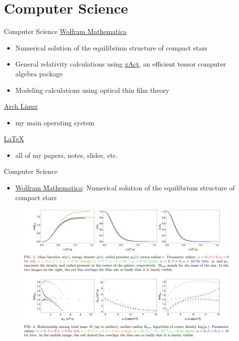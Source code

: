 \documentclass[9pt,aspectratio=169,hyperref=colorlinks]{beamer}
\begin{document}
\section{Computer Science}
\begin{frame}{Computer Science}
    \href{https://www.wolfram.com/mathematica/}{Wolfram Mathematica}
    \begin{itemize}
        \item Numerical solution of the equilibrium structure of compact stars
        \item General relativity calculations using \href{http://xact.es/index.html}{xAct}, an efficient tensor computer algebra package
        \item Modeling calculations using optical thin film theory
    \end{itemize}

    \href{https://archlinux.org}{Arch Linux}
    \begin{itemize}
        \item my main operating system
    \end{itemize}

    \href{https://www.latex-project.org}{\LaTeX}
    \begin{itemize}
        \item all of my papers, notes, slides, etc.
    \end{itemize}
\end{frame}

\begin{frame}{Computer Science}
    \begin{itemize}
        \item \href{https://www.wolfram.com/mathematica/}{Wolfram Mathematica}: Numerical solution of the equilibrium structure of compact stars
    \end{itemize}

    \begin{figure}
        \centering
        \includegraphics[scale=0.2]{CV/figs/2210.01574.png}
    \end{figure}
\end{frame}
\end{document}
